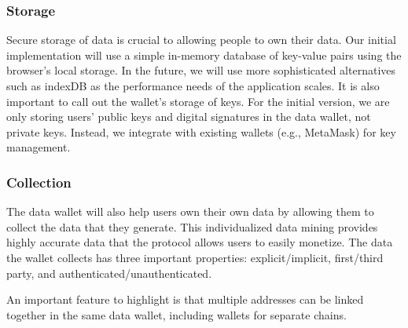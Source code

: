 
\subsubsection{Storage}
Secure storage of data is crucial to allowing people to own their data. Our initial implementation will use a simple in-memory 
database of key-value pairs using the browser's local storage. In the future, we will use more sophisticated alternatives such 
as indexDB as the performance needs of the application scales. It is also important to call out the wallet's storage of keys. 
For the initial version, we are only storing users' public keys and digital signatures in the data wallet, not private keys. 
Instead, we integrate with existing wallets (e.g., MetaMask) for key management.


\subsubsection{Collection}
The data wallet will also help users own their own data by allowing them to collect the data that they generate. This individualized data mining provides highly accurate data that the protocol allows users to easily monetize. The data the wallet collects has three important properties: explicit/implicit, first/third party, and authenticated/unauthenticated. %

An important feature to highlight is that multiple addresses can be linked together in the same data wallet, including wallets for separate chains. %


